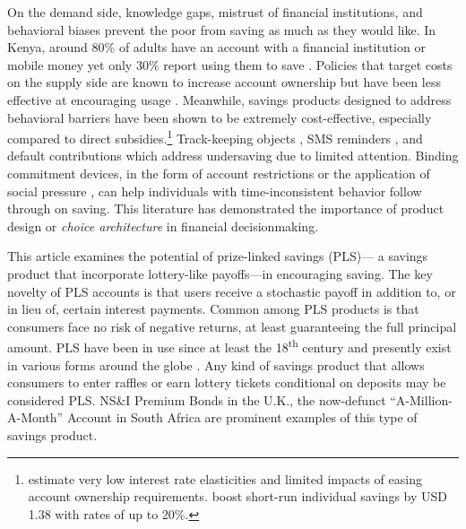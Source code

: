 \documentclass[11pt]{article}
\begin{document}
	On the demand side, knowledge gaps, mistrust of financial institutions, and behavioral biases prevent the poor from saving as much as they would like. In Kenya, around 80\% of adults have an account with a financial institution or mobile money yet only 30\% report using them to save \parencite{demirguc-kunt_global_2018}. Policies that target costs on the supply side are known to increase account ownership but have been less effective at encouraging usage \parencite{dupas_why_2013,karlan_banking_2016}. Meanwhile, savings products designed to address behavioral barriers have been shown to be extremely cost-effective, especially compared to direct subsidies.\footnote{\textcite{karlan_price_2018} estimate very low interest rate elasticities and limited impacts of easing account ownership requirements. \textcite{schaner_persistent_2018} boost short-run individual savings by USD 1.38 with rates of up to 20\%.} Track-keeping objects \parencite{akbas_how_2016}, SMS reminders \parencite{karlan_getting_2010}, and default contributions \parencite{thaler_save_2004,chetty_active_2014,somville_saving_2018} which address undersaving due to limited attention. Binding commitment devices, in the form of account restrictions \parencite{ashraf_tying_2006} or the application of social pressure \parencite{dupas_why_2013}, can help individuals with time-inconsistent behavior follow through on saving. This literature has demonstrated the importance of product design or \textit{choice architecture} in financial decisionmaking.

	This article examines the potential of prize-linked savings (PLS)--- a savings product that incorporate lottery-like payoffs---in encouraging saving. The key novelty of PLS accounts is that users receive a stochastic payoff in addition to, or in lieu of, certain interest payments. Common among PLS products is that consumers face no risk of negative returns, at least guaranteeing the full principal amount. PLS have been in use since at least the 18\textsuperscript{th} century and presently exist in various forms around the globe \parencite{murphy_lotteries_2005,kearney_making_2010}. Any kind of savings product that allows consumers to enter raffles or earn lottery tickets conditional on deposits may be considered PLS. NS\&I Premium Bonds in the U.K., the now-defunct ``A-Million-A-Month'' Account in South Africa are prominent examples of this type of savings product.
\end{document}
